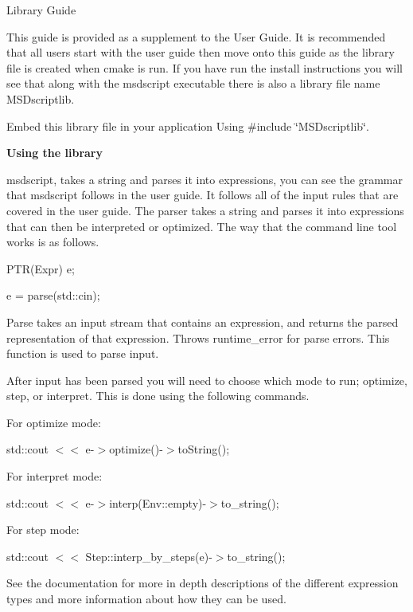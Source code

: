 Library Guide

This guide is provided as a supplement to the User Guide. It is recommended that all users start with the user guide then move onto this guide as the library file is created when cmake is run. If you have run the install instructions you will see that along with the msdscript executable there is also a library file name M\+S\+Dscriptlib.

Embed this library file in your application Using \#include {\ttfamily \char`\"{}\+M\+S\+Dscriptlib\char`\"{}}.

{\bfseries{Using the library}}

msdscript, takes a string and parses it into expressions, you can see the grammar that msdscript follows in the user guide. It follows all of the input rules that are covered in the user guide. The parser takes a string and parses it into expressions that can then be interpreted or optimized. The way that the command line tool works is as follows.

{\ttfamily P\+T\+R(\+Expr) e;}

{\ttfamily e = parse(std\+::cin);}

Parse takes an input stream that contains an expression, and returns the parsed representation of that expression. Throws {\ttfamily runtime\+\_\+error} for parse errors. This function is used to parse input.

After input has been parsed you will need to choose which mode to run; optimize, step, or interpret. This is done using the following commands.

For optimize mode\+:

{\ttfamily std\+::cout $<$$<$ e-\/$>$optimize()-\/$>$to\+String();}

For interpret mode\+:

{\ttfamily std\+::cout $<$$<$ e-\/$>$interp(\+Env\+::empty)-\/$>$to\+\_\+string();}

For step mode\+:

{\ttfamily std\+::cout $<$$<$ Step\+::interp\+\_\+by\+\_\+steps(e)-\/$>$to\+\_\+string();}

See the documentation for more in depth descriptions of the different expression types and more information about how they can be used. 